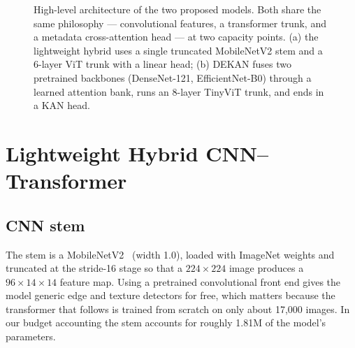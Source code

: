 \begin{figure}[H]
{%
}
\caption{High-level architecture of the two proposed models. Both share the same
philosophy --- convolutional features, a transformer trunk, and a metadata
cross-attention head --- at two capacity points. (a) the lightweight hybrid uses
a single truncated MobileNetV2 stem and a 6-layer ViT trunk with a linear head;
(b) DEKAN fuses two pretrained backbones (DenseNet-121, EfficientNet-B0) through
a learned attention bank, runs an 8-layer TinyViT trunk, and ends in a KAN head.}
\label{fig:arch}
\end{figure}

\section{Lightweight Hybrid CNN--Transformer}

\subsection{CNN stem}

The stem is a MobileNetV2~\cite{sandler2018mobilenetv2} (width 1.0), loaded with
ImageNet weights and truncated at the stride-16 stage so that a
$224\times224$ image produces a $96\times14\times14$ feature map. Using a
pretrained convolutional front end gives the model generic edge and texture
detectors for free, which matters because the transformer that follows is trained
from scratch on only about 17{,}000 images. In our budget accounting the stem
accounts for roughly 1.81M of the model's parameters.

